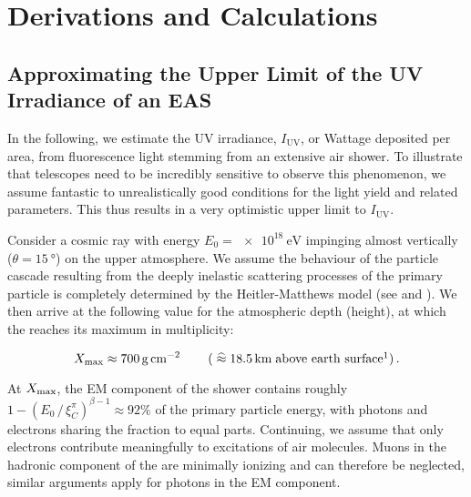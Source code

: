 
\chapter{Derivations and Calculations}
\label{app:derivation}


\section{Approximating the Upper Limit of the UV Irradiance of an EAS}
\label{app:cr-uv-irradiance}

In the following, we estimate the UV irradiance, $I_\text{UV}$, or Wattage 
deposited per area, from fluorescence light stemming from an extensive air 
shower. To illustrate that telescopes need to be incredibly sensitive to 
observe this phenomenon, we assume fantastic to unrealistically good conditions
for the \UV light yield and related parameters. This thus results in a very 
optimistic upper limit to $I_\text{UV}$.

Consider a cosmic ray with energy $E_0 = \SI{e18}{\eV}$ impinging almost 
vertically ($\theta=\SI{15}{\degree}$) on the upper 
atmosphere. We assume the behaviour of the particle cascade resulting from the 
deeply inelastic scattering processes of the primary particle is completely 
determined by the Heitler-Matthews model (see  and 
\cite{Matthews2005, Risse2006}). We then arrive at the following value for the 
atmospheric depth (height), at which the \EAS reaches its maximum in 
multiplicity:

\begin{equation}
\label{eq:irradiance-multiplicity}
\Xmax \approx \SI{700}{\gram\per\centi\meter\squared}\qquad\left(\;\widehat{\approx}\;\SI{18.5}{\kilo\meter}\;\text{above earth surface}\footnotemark\right).
\end{equation}

At $X_\mathrm{max}$, the EM component of the shower contains roughly
$1-\left(E_0\,/\,\xi^\pi_C\right)^{\beta-1}\approx92\%$ of the primary particle 
energy, with photons and electrons sharing the fraction to equal parts.
Continuing, we assume that only electrons contribute meaningfully to excitations
of air molecules. Muons in the hadronic component of the \EAS are minimally 
ionizing and can therefore be neglected, similar arguments apply for photons in 
the EM component.

